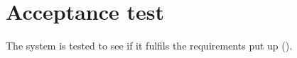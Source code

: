 \chapter{Acceptance test} \label{chap:acceptanceTest}
The system is tested to see if it fulfils the requirements put up ().

